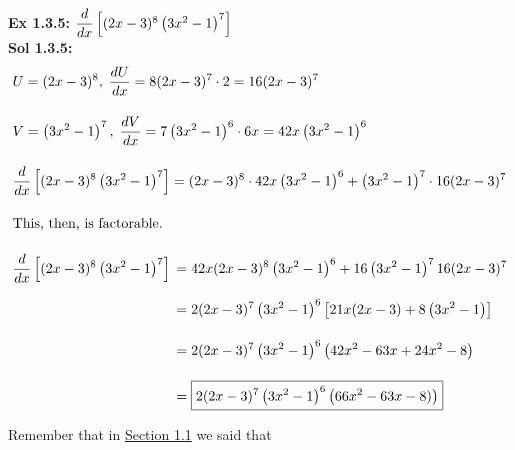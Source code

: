 \textbf{Ex 1.3.5: } $\dfrac{d}{dx} \left[(2x - 3)^8\left(3x^2 - 1\right)^7\right]$ \\[11pt]
\textbf{Sol 1.3.5: } \begin{align*}
    & U = (2x - 3)^8, \; \dfrac{dU}{dx} = 8(2x - 3)^7 \cdot 2 = 16(2x - 3)^7 \\[11pt]
    & V = \left(3x^2 - 1\right)^7, \; \dfrac{dV}{dx} = 7\left(3x^2 - 1\right)^6 \cdot 6x  = 42x\left(3x^2 - 1\right)^6\\[11pt]
    & \dfrac{d}{dx} \left[(2x - 3)^8\left(3x^2 - 1\right)^7\right] = (2x - 3)^8 \cdot 42x\left(3x^2 - 1\right)^6 + \left(3x^2 - 1\right)^7 \cdot 16(2x - 3)^7 \\[11pt]
    & \text{This, then, is factorable.} \\[11pt]
    & \dfrac{d}{dx} \left[(2x - 3)^8\left(3x^2 - 1\right)^7\right] \begin{aligned}[t]
        & = 42x(2x - 3)^8\left(3x^2 - 1\right)^6 + 16\left(3x^2 - 1\right)^7 16(2x - 3)^7 \\[11pt]
        & = 2(2x - 3)^7\left(3x^2 - 1\right)^6\left[21x(2x - 3) + 8\left(3x^2 - 1\right)\right] \\[11pt]
        & = 2(2x - 3)^7\left(3x^2 - 1\right)^6\left(42x^2 - 63x + 24x^2 - 8\right) \\[11pt]
        & = \boxed{2(2x - 3)^7\left(3x^2 - 1\right)^6\left(66x^2 - 63x - 8)\right)}
    \end{aligned}
\end{align*}

Remember that in \hyperlink{Section 1.1}{Section 1.1} we said that 


